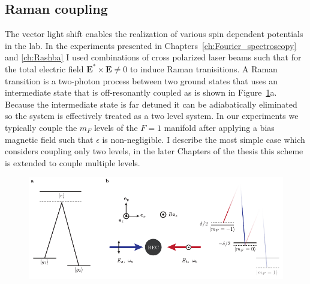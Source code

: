 \subsection{Raman coupling}

The vector light shift enables the realization of various spin dependent potentials in the lab. In the experiments presented in Chapters~\ref{ch:Fourier_spectroscopy} and \ref{ch:Rashba} I used combinations of cross polarized laser beams such that for the total electric field $\mathbf{E}^*\times\mathbf{E}\neq0$ to induce Raman tranisitions. A Raman transition is a two-photon process between two ground states that uses an intermediate state that is off-resonantly coupled as is shown in Figure~\ref{fig:Raman_coupling}a. Because the intermediate state is far detuned it can be adiabatically eliminated~\cite{han_raman_2013} so the system is effectively treated as a two level system. In our experiments we typically couple the $m_F$ levels of the $F=1$ manifold after applying a bias magnetic field such that $\epsilon$ is non-negligible. I describe the most simple case which considers coupling only two levels, in the later Chapters of the thesis this scheme is extended to couple multiple levels. 

\begin{figure}[htb]
\begin{center}
\includegraphics[]{Figures/Chapter3/Raman_coupling.pdf}
\caption[Raman coupling with two-photon transitions]{}
\label{fig:Raman_coupling}
\end{center}
\end{figure}

